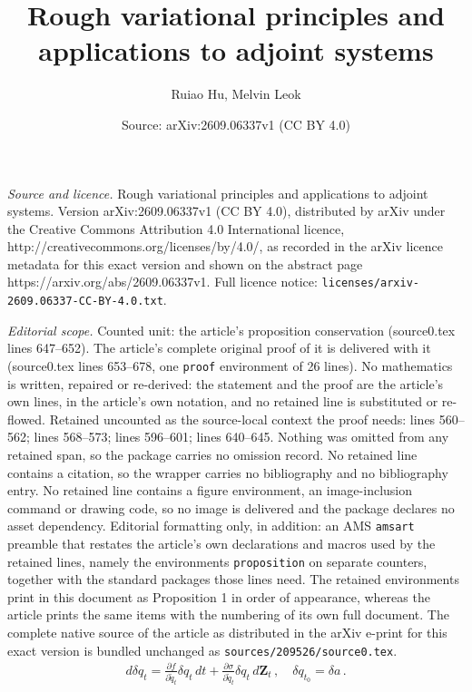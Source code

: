 \documentclass[10pt,a4paper]{amsart}
\title{Rough variational principles and applications to adjoint systems}
\author{Ruiao Hu, Melvin Leok}
\date{Source: arXiv:2609.06337v1 (CC BY 4.0)}
\def\p{{\partial}}
\newcommand{\wt}[1]{\widetilde{#1}}
\begin{document}
\maketitle

\noindent\emph{Source and licence.} Rough variational principles and applications to adjoint systems. Version arXiv:2609.06337v1 (CC BY 4.0), distributed by arXiv under the Creative Commons Attribution 4.0 International licence, http://creativecommons.org/licenses/by/4.0/, as recorded in the arXiv licence metadata for this exact version and shown on the abstract page https://arxiv.org/abs/2609.06337v1. Full licence notice: \texttt{licenses/arxiv-2609.06337-CC-BY-4.0.txt}.\par\smallskip

\noindent\textit{Editorial scope.} Counted unit: the article's proposition conservation (source0.tex lines 647--652). The article's complete original proof of it is delivered with it (source0.tex lines 653--678, one \texttt{proof} environment of 26 lines). No mathematics is written, repaired or re-derived: the statement and the proof are the article's own lines, in the article's own notation, and no retained line is substituted or re-flowed.  Retained uncounted as the source-local context the proof needs: lines 560--562; lines 568--573; lines 596--601; lines 640--645.  Nothing was omitted from any retained span, so the package carries no omission record.  No retained line contains a citation, so the wrapper carries no bibliography and no bibliography entry.  No retained line contains a figure environment, an image-inclusion command or drawing code, so no image is delivered and the package declares no asset dependency.  Editorial formatting only, in addition: an AMS \texttt{amsart} preamble that restates the article's own declarations and macros used by the retained lines, namely the environments \texttt{proposition} on separate counters, together with the standard packages those lines need.  The retained environments print in this document as Proposition 1 in order of appearance, whereas the article prints the same items with the numbering of its own full document.  The complete native source of the article as distributed in the arXiv e-print for this exact version is bundled unchanged as \texttt{sources/209526/source0.tex}.
\begin{align}\label{eq:rough variational eq}
    d \delta q_t = \frac{\p f}{\p \wt{q}_t}\delta q_t\, dt + \frac{\p \sigma}{\p \wt{q}_t}\delta q_t \,d\mathbf{Z}_t\,,\quad \delta q_{t_0} = \delta a\,.
\end{align}
\end{document}
